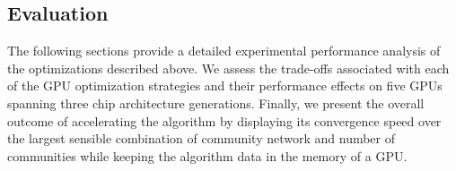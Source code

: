 \subsection{Evaluation}
\label{sec-evaluation}

The following sections provide a detailed experimental performance analysis
of the optimizations described above.
%
We assess the trade-offs associated with each of the GPU optimization
strategies and their performance effects on five GPUs spanning three chip
architecture generations.
%
Finally, we present the overall outcome of accelerating the algorithm by
displaying its convergence speed over the largest sensible combination of
community network and number of communities while keeping the algorithm data
in the memory of a GPU.




% 


